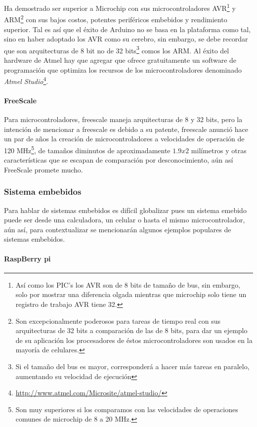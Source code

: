 \documentclass{article}
\begin{document}
Ha demostrado ser superior a Microchip con sus microcontroladores 
AVR\footnote{Así como los PIC's los AVR son de 8 bits
de tamaño de bus, sin embargo, solo por mostrar una diferencia olgada
 mientras que microchip solo tiene un registro de trabajo AVR tiene 32.} y ARM\footnote{Son excepcionalmente poderosos para tareas de tiempo real
		 con sus arquitecturas de 32 bits a comparación de las de 8 bits,
 para dar un ejemplo de su aplicación los procesadores de éstos 
 microcontroladores son usados en la mayoría de celulares.} con sus bajos
 costos, potentes periféricos embebidos y rendimiento superior. Tal es así
 que el éxito de Arduino no se basa en la plataforma como tal, sino en 
 haber adoptado los AVR como su cerebro, sin embargo, se debe recordar que
 son arquitecturas de 8 bit no de 32 bits\footnote{Si el tamaño del bus
		 es mayor, corresponderá a hacer más tareas en paralelo, aumentando
 su velocidad de ejecución} comos los ARM. Al éxito del hardware de Atmel
 hay que agregar que ofrece gratuitamente un software de programación
 que optimiza los recursos de los microcontroladores denominado 
 \textit{Atmel Studio}\footnote{\url{http://www.atmel.com/Microsite/atmel-studio/}}. 

\paragraph{FreeScale}

Para microcontroladores, freescale maneja arquitecturas de 8 y 32 bits, pero
la intención de mencionar a freescale es debido a su patente, freescale
anunció hace un par de años la creación de microcontroladores a velocidades
de operación de 120 MHz\footnote{Son muy superiores si los comparamos con
las velocidades de operaciones comunes de microchip de 8 a 20 MHz.}, de 
tamaños diminutos de aproximadamente $1.9 x 2$ milímetros y otras 
características que se escapan de comparación por desconocimiento, aún así
FreeScale promete mucho.

\subsubsection{Sistema embebidos}

Para hablar de sistemas embebidos es difícil globalizar pues un sistema
emebido puede ser desde una calculadora, un celular o hasta el mismo 
microcontrolador, aún así, para contextualizar se mencionarán algunos
ejemplos populares de sistemas embebidos.

\paragraph{RaspBerry pi}
\end{document}
